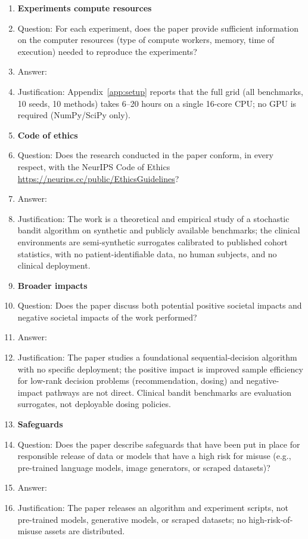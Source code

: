 \begin{enumerate}
\item {\bf Experiments compute resources}
    \item[] Question: For each experiment, does the paper provide sufficient information on the computer resources (type of compute workers, memory, time of execution) needed to reproduce the experiments?
    \item[] Answer: \answerYes{}
    \item[] Justification: Appendix~\ref{app:setup} reports that the full grid (all benchmarks, 10 seeds, 10 methods) takes 6--20 hours on a single 16-core CPU; no GPU is required (NumPy/SciPy only).

\item {\bf Code of ethics}
    \item[] Question: Does the research conducted in the paper conform, in every respect, with the NeurIPS Code of Ethics \url{https://neurips.cc/public/EthicsGuidelines}?
    \item[] Answer: \answerYes{}
    \item[] Justification: The work is a theoretical and empirical study of a stochastic bandit algorithm on synthetic and publicly available benchmarks; the clinical environments are semi-synthetic surrogates calibrated to published cohort statistics, with no patient-identifiable data, no human subjects, and no clinical deployment.

\item {\bf Broader impacts}
    \item[] Question: Does the paper discuss both potential positive societal impacts and negative societal impacts of the work performed?
    \item[] Answer: \answerNA{}
    \item[] Justification: The paper studies a foundational sequential-decision algorithm with no specific deployment; the positive impact is improved sample efficiency for low-rank decision problems (recommendation, dosing) and negative-impact pathways are not direct. Clinical bandit benchmarks are evaluation surrogates, not deployable dosing policies.

\item {\bf Safeguards}
    \item[] Question: Does the paper describe safeguards that have been put in place for responsible release of data or models that have a high risk for misuse (e.g., pre-trained language models, image generators, or scraped datasets)?
    \item[] Answer: \answerNA{}
    \item[] Justification: The paper releases an algorithm and experiment scripts, not pre-trained models, generative models, or scraped datasets; no high-risk-of-misuse assets are distributed.


\end{enumerate}

